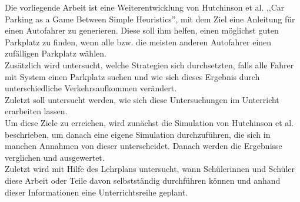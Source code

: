 Die vorliegende Arbeit ist eine Weiterentwicklung von Hutchinson et al. ,,Car Parking as a Game Between Simple Heuristics'', mit dem Ziel eine Anleitung für einen Autofahrer zu generieren. Diese soll ihm helfen, einen möglichst guten Parkplatz zu finden, wenn alle bzw. die meisten anderen Autofahrer einen zufälligen Parkplatz wählen.\\
Zusätzlich wird untersucht, welche Strategien sich durchsetzten, falls alle Fahrer mit System einen Parkplatz suchen und wie sich dieses Ergebnis durch unterschiedliche Verkehrsaufkommen verändert.\\
 Zuletzt soll untersucht werden, wie sich diese Untersuchungen im Unterricht erarbeiten lassen.\\
  Um diese Ziele zu erreichen, wird zunächst die Simulation von Hutchinson et al. beschrieben, um danach eine eigene Simulation durchzuführen, die sich in manchen Annahmen von dieser unterscheidet. Danach werden die Ergebnisse verglichen und ausgewertet.\\
  Zuletzt wird mit Hilfe des Lehrplans untersucht, wann Schülerinnen und Schüler diese Arbeit oder Teile davon selbstständig durchführen können und anhand dieser Informationen eine Unterrichtsreihe geplant.